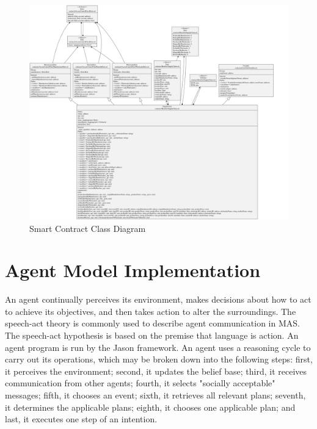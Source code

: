 \begin{figure}[h!]
\centering
  \includegraphics[width=21cm, angle=90]{includes/figures/OverallClassDiagram.png} 
  \caption{Smart Contract Class Diagram}
  \label{Overall Class Diagram}
\end{figure}

\section{Agent Model Implementation}

An agent continually perceives its environment, makes decisions about how to act to achieve its objectives, and then takes action to alter the surroundings. The speech-act theory is commonly used to describe agent communication in \ac{MAS}. The speech-act hypothesis is based on the premise that language is action. An agent program is run by the Jason framework. An agent uses a reasoning cycle to carry out its operations, which may be broken down into the following steps: first, it perceives the environment; second, it updates the belief base; third, it receives communication from other agents; fourth, it selects "socially acceptable" messages; fifth, it chooses an event; sixth, it retrieves all relevant plans; seventh, it determines the applicable plans; eighth, it chooses one applicable plan; and last, it executes one step of an intention.


